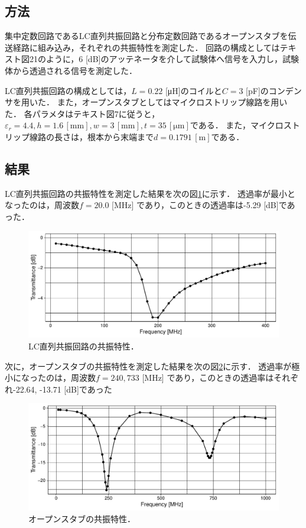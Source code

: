\documentclass[uplatex,dvipdfmx,a4j,12pt]{jsarticle}
\begin{document}
\subsection{方法}
集中定数回路であるLC直列共振回路と分布定数回路であるオープンスタブを伝送経路に組み込み，それぞれの共振特性を測定した．
回路の構成としてはテキスト図21のように，6 [dB]のアッテネータを介して試験体へ信号を入力し，試験体から透過される信号を測定した．

LC直列共振回路の構成としては，$L = 0.22$ [\si{\micro \henry}]のコイルと$C = 3$ [\si{\pico \farad}]のコンデンサを用いた． 
また，オープンスタブとしてはマイクロストリップ線路を用いた．
各パラメタはテキスト図7に従うと，$\varepsilon_r = 4.4, h = 1.6\mathrm{\,[mm]}, w = 3\mathrm{\,[mm]}, t = 35\mathrm{\,[\mu m]}$である．
また，マイクロストリップ線路の長さは，根本から末端まで$d = 0.1791\mathrm{\,[m]}$である．

\subsection{結果}
LC直列共振回路の共振特性を測定した結果を次の図\ref{fig:3-1}に示す．
透過率が最小となったのは，周波数$f = 20.0$ [MHz] であり，このときの透過率は-5.29 [dB]であった．
\begin{figure}[H]
    \centering
    \includegraphics[width=\linewidth]{data/3_1/transmittance.pdf}
    \caption{LC直列共振回路の共振特性．}
    \label{fig:3-1}
\end{figure}

次に，オープンスタブの共振特性を測定した結果を次の図\ref{fig:3-2}に示す．
透過率が極小になったのは，周波数$f = 240, 733$ [MHz] であり，このときの透過率はそれぞれ-22.64, -13.71 [dB]であった
\begin{figure}[H]
    \centering
    \includegraphics[width=\linewidth]{data/3_2/transmittance.pdf}
    \caption{オープンスタブの共振特性．}
    \label{fig:3-2}
\end{figure}
\end{document}
